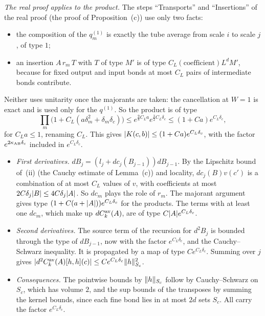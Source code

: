\begin{detail}
\begin{step}
\emph{The real proof applies to the product.} The steps ``Transports'' and ``Insertions'' of the real proof (the proof of Proposition~(c)) use only two facts:
\begin{itemize}
\item the composition of the $q^{(1)}_m$ is exactly the tube average from scale $i$ to scale $j$, of type $1$;
\item an insertion $A\,r_m\,T$ with $T$ of type $M'$ is of type $C_L(\text{coefficient})L^dM'$, because for fixed output and input bonds at most $C_L$ pairs of intermediate bonds contribute.
\end{itemize}
Neither uses unitarity once the majorants are taken: the cancellation at $W=1$ is exact and is used only for the $q^{(1)}$. So the product is of type
\[
\prod_m\big(1+C_L(a\delta_m^2+\delta_m\delta_c)\big)\le e^{\frac98C_La}e^{\frac32C_L\delta_c}\le(1+Ca)e^{C_L\delta_c},
\]
for $C_La\le1$, renaming $C_L$. This gives $\lvert K(c,b)\rvert\le(1+Ca)e^{C_L\delta_c}$, with the factor $e^{2\kappa_{\rm AB}\delta_c}$ included in $e^{C_L\delta_c}$.
\end{step}

\begin{step}[(c): derivatives]
\begin{itemize}
\item \emph{First derivatives.} $dB_j=(l_j+dc_j(B_{j-1}))dB_{j-1}$. By the Lipschitz bound of~(ii) (the Cauchy estimate of Lemma~(c)) and locality, $dc_j(B)v(c')$ is a combination of at most $C_L$ values of $v$, with coefficients at most $2C\delta_j\lvert B\rvert\le4C\delta_j\lvert A\rvert$. So $dc_m$ plays the role of $r_m$. The majorant argument gives type $(1+C(a+\lvert A\rvert))e^{C_L\delta_c}$ for the products. The terms with at least one $dc_m$, which make up $dC^{\rm av}_k(A)$, are of type $C\lvert A\rvert e^{C_L\delta_c}$.
\item \emph{Second derivatives.} The source term of the recursion for $d^2B_j$ is bounded through the type of $dB_{j-1}$, now with the factor $e^{C_L\delta_c}$, and the Cauchy--Schwarz inequality. It is propagated by a map of type $Ce^{C_L\delta_c}$. Summing over $j$ gives $\lvert d^2C^{\rm av}_k(A)[h,h](c)\rvert\le Ce^{C_L\delta_c}\lVert h\rVert^2_{S_c}$.
\item \emph{Consequences.} The pointwise bounds by $\lVert h\rVert_{S_c}$ follow by Cauchy--Schwarz on $S_c$, which has volume $2$, and the sup bounds of the transposes by summing the kernel bounds, since each fine bond lies in at most $2d$ sets $S_c$. All carry the factor $e^{C_L\delta_c}$.
\end{itemize}
\end{step}


\end{detail}
